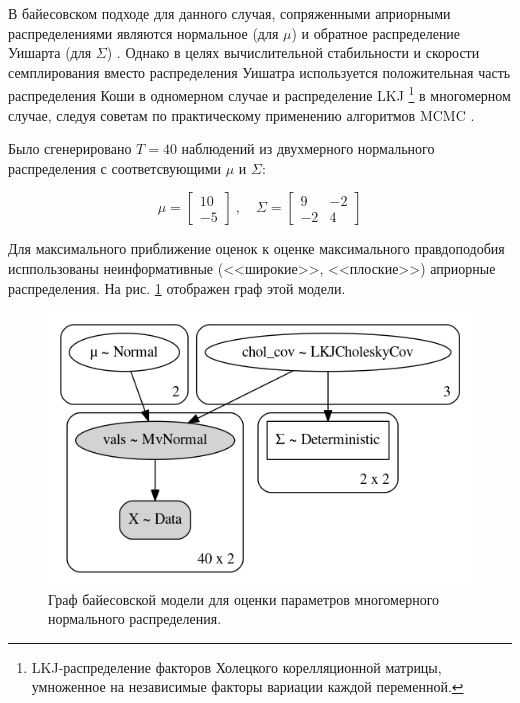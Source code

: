 \documentclass[a4paper,14pt]{extreport}
\begin{document}
В байесовском подходе для данного случая, сопряженными априорными распределениями являются нормальное (для $\mu$) и обратное распределение Уишарта (для $\Sigma$) \cite{stan_user_guide}. Однако в целях вычислительной стабильности и скорости семплирования вместо распределения Уишатра используется положительная часть распределения Коши в одномерном случае и распределение LKJ \footnote{LKJ-распределение факторов Холецкого корелляционной матрицы, умноженное на независимые факторы вариации каждой переменной. } в многомерном случае, следуя советам по практическому применению алгоритмов MCMC \cite{stan_user_guide}.

Было сгенерировано $T=40$ наблюдений из двухмерного нормального распределения с соответсвующими $\mu$ и $\Sigma$:

\begin{equation}
	\mu = 
	\begin{bmatrix}
		10 \\
		-5
	\end{bmatrix}
	\	, \quad
	\Sigma = 
	\begin{bmatrix} 
		9  & -2 \\
		-2 & 4 
	\end{bmatrix}
\end{equation}

Для максимального приближение оценок к оценке максимального правдоподобия исппользованы неинформативные (<<широкие>>, <<плоские>>) априорные распределения. На рис. \ref{fig:pp_mvn_graph} отображен граф этой модели.

\begin{figure}[H]
	\includegraphics[width=\linewidth]{img/gen/pp_mvn_graph.png}
	\caption{Граф байесовской модели для оценки параметров многомерного нормального распределения. }
	\label{fig:pp_mvn_graph}
\end{figure}
\end{document}
